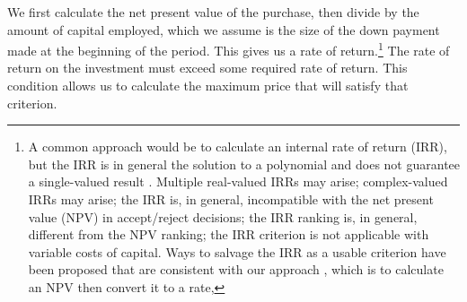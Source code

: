 We first calculate the net present value of the purchase, then divide by the amount of capital employed, which we assume is the size of the down payment made at the beginning of the period. This gives us a rate of return.\footnote{A common approach would be to calculate an internal rate of return (IRR), but  the IRR is in general the solution to a polynomial and does not guarantee a single-valued result \cite{robinsonOptimalTerminationIRR1996}. Multiple real-valued  IRRs may arise;  complex-valued IRRs may arise;  the IRR is, in general, incompatible with the net present value (NPV) in accept/reject decisions; the IRR ranking is, in general, different from the NPV ranking; the IRR criterion is not applicable with variable costs of capital. Ways to salvage the IRR as a usable criterion have been proposed that are consistent with our approach \cite{magniAverageInternalRate2010}, which is to calculate an NPV then convert it to a rate,} 
The rate of return on the investment must exceed some required rate of return. This condition allows us to calculate the maximum price that will satisfy that criterion.










